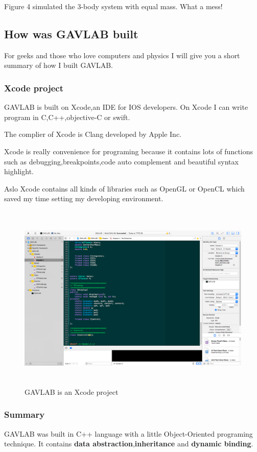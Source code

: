 \documentclass[12pt]{article}
\begin{document}
Figure 4 simulated the 3-body system with equal mass.
What a mess!

\clearpage
\subsection{How was GAVLAB built} 
For geeks and those who love computers and physics I will give you a short summary of how I built GAVLAB.
\subsubsection{Xcode project}
GAVLAB is built on Xcode,an IDE for IOS developers.
On Xcode I can write program in C,C++,objective-C or swift.

The complier of Xcode is Clang developed by Apple Inc.

Xcode is really convenience for programing because it contains lots of functions
such as debugging,breakpoints,code auto complement and beautiful syntax highlight.

Aslo Xcode contains all kinds of libraries such as OpenGL or OpenCL which saved my time setting my developing environment.
\begin{figure}[H]
\centering
\includegraphics[width=14.4cm,height=9cm]{Xcode.png}
\caption{GAVLAB is an Xcode project}
\end{figure}

\clearpage
\subsubsection{Summary}
GAVLAB was built in C++ language with a little Object-Oriented programing technique.
It contains \textbf{data abstraction},\textbf{inheritance} and \textbf{dynamic binding}.
\end{document}

